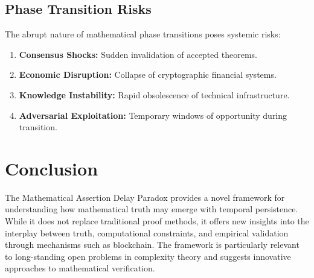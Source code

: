 \documentclass[11pt]{article}
\begin{document}
\subsection{Phase Transition Risks}

The abrupt nature of mathematical phase transitions poses systemic risks:
\begin{enumerate}[label=(\arabic*)]
    \item \textbf{Consensus Shocks:} Sudden invalidation of accepted theorems.
    \item \textbf{Economic Disruption:} Collapse of cryptographic financial systems.
    \item \textbf{Knowledge Instability:} Rapid obsolescence of technical infrastructure.
    \item \textbf{Adversarial Exploitation:} Temporary windows of opportunity during transition.
\end{enumerate}

\section{Conclusion}

The Mathematical Assertion Delay Paradox provides a novel framework for understanding how mathematical truth may emerge with temporal persistence. While it does not replace traditional proof methods, it offers new insights into the interplay between truth, computational constraints, and empirical validation through mechanisms such as blockchain. The framework is particularly relevant to long-standing open problems in complexity theory and suggests innovative approaches to mathematical verification.
\end{document}
